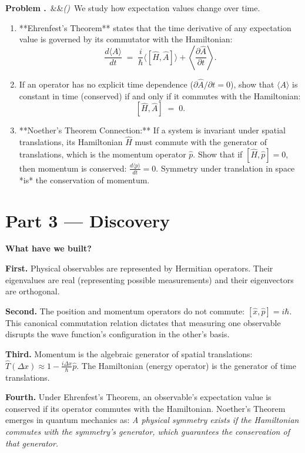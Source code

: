 \documentclass[12pt, a4paper, twoside]{book}
\newcounter{problem}[chapter]
\newcommand{\problem}[1][]{\refstepcounter{problem}\medskip\noindent
  \textcolor{accent}{\textbf{Problem \theproblem.}}\ \ifx&#1&\else\textit{(#1)}\ \fi}
\begin{document}
\begin{explobox}
\problem We study how expectation values change over time.
\begin{enumerate}[label=(\alph*), topsep=2pt]
  \item **Ehrenfest's Theorem** states that the time derivative of any expectation value is governed by its commutator with the Hamiltonian:
  \[
    \frac{d\langle A \rangle}{dt} \;=\; \frac{i}{\hbar} \langle [\hat{H}, \hat{A}] \rangle + \left\langle \frac{\partial \hat{A}}{\partial t} \right\rangle.
  \]
  \item If an operator has no explicit time dependence ($\partial \hat{A}/\partial t = 0$), show that $\langle A \rangle$ is constant in time (conserved) if and only if it commutes with the Hamiltonian:
  \[
    [\hat{H}, \hat{A}] \;=\; 0.
  \]
  \item **Noether's Theorem Connection:** If a system is invariant under spatial translations, its Hamiltonian $\hat{H}$ must commute with the generator of translations, which is the momentum operator $\hat{p}$.
  Show that if $[\hat{H}, \hat{p}] = 0$, then momentum is conserved: $\frac{d\langle p \rangle}{dt} = 0$.
  Symmetry under translation in space *is* the conservation of momentum.
\end{enumerate}
\end{explobox}

\newpage

\section{Part 3 --- Discovery}

\begin{discoverybox}
\textbf{What have we built?}

\textbf{First.} Physical observables are represented by Hermitian operators. Their eigenvalues are real (representing possible measurements) and their eigenvectors are orthogonal.

\textbf{Second.} The position and momentum operators do not commute: $[\hat{x}, \hat{p}] = i\hbar$. This canonical commutation relation dictates that measuring one observable disrupts the wave function's configuration in the other's basis.

\textbf{Third.} Momentum is the algebraic generator of spatial translations: $\hat{T}(\Delta x) \approx 1 - \frac{i\Delta x}{\hbar}\hat{p}$. The Hamiltonian (energy operator) is the generator of time translations.

\textbf{Fourth.} Under Ehrenfest's Theorem, an observable's expectation value is conserved if its operator commutes with the Hamiltonian. Noether's Theorem emerges in quantum mechanics as: \emph{A physical symmetry exists if the Hamiltonian commutes with the symmetry's generator, which guarantees the conservation of that generator.}
\end{discoverybox}
\end{document}
